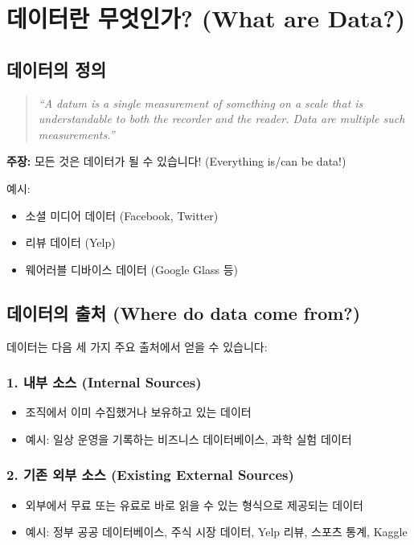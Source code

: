 \documentclass[12pt,a4paper]{article}
\begin{document}
\section{데이터란 무엇인가? (What are Data?)}

\subsection{데이터의 정의}

\begin{quote}
\textit{``A datum is a single measurement of something on a scale that is understandable to both the recorder and the reader. Data are multiple such measurements.''}
\end{quote}

\textbf{주장:} 모든 것은 데이터가 될 수 있습니다! (Everything is/can be data!)

예시:
\begin{itemize}
    \item 소셜 미디어 데이터 (Facebook, Twitter)
    \item 리뷰 데이터 (Yelp)
    \item 웨어러블 디바이스 데이터 (Google Glass 등)
\end{itemize}

\subsection{데이터의 출처 (Where do data come from?)}

데이터는 다음 세 가지 주요 출처에서 얻을 수 있습니다:

\subsubsection{1. 내부 소스 (Internal Sources)}
\begin{itemize}
    \item 조직에서 이미 수집했거나 보유하고 있는 데이터
    \item 예시: 일상 운영을 기록하는 비즈니스 데이터베이스, 과학 실험 데이터
\end{itemize}

\subsubsection{2. 기존 외부 소스 (Existing External Sources)}
\begin{itemize}
    \item 외부에서 무료 또는 유료로 바로 읽을 수 있는 형식으로 제공되는 데이터
    \item 예시: 정부 공공 데이터베이스, 주식 시장 데이터, Yelp 리뷰, 스포츠 통계, Kaggle
\end{itemize}
\end{document}
